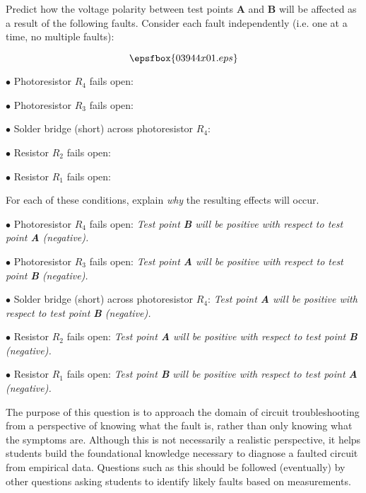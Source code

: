 

Predict how the voltage polarity between test points {\bf A} and {\bf B} will be affected as a result of the following faults.  Consider each fault independently (i.e. one at a time, no multiple faults):

$$\epsfbox{03944x01.eps}$$

\medskip
\item{$\bullet$} Photoresistor $R_4$ fails open:
\vskip 5pt
\item{$\bullet$} Photoresistor $R_3$ fails open:
\vskip 5pt
\item{$\bullet$} Solder bridge (short) across photoresistor $R_4$:
\vskip 5pt
\item{$\bullet$} Resistor $R_2$ fails open:
\vskip 5pt
\item{$\bullet$} Resistor $R_1$ fails open:
\medskip

For each of these conditions, explain {\it why} the resulting effects will occur.







\medskip
\item{$\bullet$} Photoresistor $R_4$ fails open: {\it Test point {\bf B} will be positive with respect to test point {\bf A} (negative).}
\vskip 5pt
\item{$\bullet$} Photoresistor $R_3$ fails open: {\it Test point {\bf A} will be positive with respect to test point {\bf B} (negative).}
\vskip 5pt
\item{$\bullet$} Solder bridge (short) across photoresistor $R_4$: {\it Test point {\bf A} will be positive with respect to test point {\bf B} (negative).}
\vskip 5pt
\item{$\bullet$} Resistor $R_2$ fails open: {\it Test point {\bf A} will be positive with respect to test point {\bf B} (negative).}
\vskip 5pt
\item{$\bullet$} Resistor $R_1$ fails open: {\it Test point {\bf B} will be positive with respect to test point {\bf A} (negative).}
\medskip







The purpose of this question is to approach the domain of circuit troubleshooting from a perspective of knowing what the fault is, rather than only knowing what the symptoms are.  Although this is not necessarily a realistic perspective, it helps students build the foundational knowledge necessary to diagnose a faulted circuit from empirical data.  Questions such as this should be followed (eventually) by other questions asking students to identify likely faults based on measurements.




